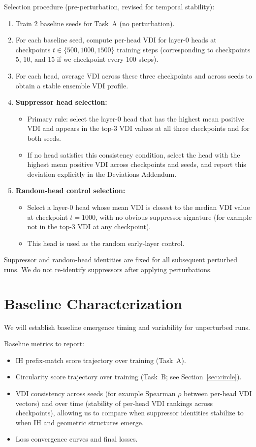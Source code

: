 \documentclass[11pt]{article}
\begin{document}
Selection procedure (pre-perturbation, revised for temporal stability):
\begin{enumerate}
  \item Train 2 baseline seeds for Task~A (no perturbation).
  \item For each baseline seed, compute per-head VDI for layer-0 heads at checkpoints $t \in \{500, 1000, 1500\}$ training steps (corresponding to checkpoints 5, 10, and 15 if we checkpoint every 100 steps).
  \item For each head, average VDI across these three checkpoints and across seeds to obtain a stable ensemble VDI profile.
  \item \textbf{Suppressor head selection:}
    \begin{itemize}
      \item Primary rule: select the layer-0 head that has the highest mean positive VDI and appears in the top-3 VDI values at all three checkpoints and for both seeds.
      \item If no head satisfies this consistency condition, select the head with the highest mean positive VDI across checkpoints and seeds, and report this deviation explicitly in the Deviations Addendum.
    \end{itemize}
  \item \textbf{Random-head control selection:}
    \begin{itemize}
      \item Select a layer-0 head whose mean VDI is closest to the median VDI value at checkpoint $t = 1000$, with no obvious suppressor signature (for example not in the top-3 VDI at any checkpoint).
      \item This head is used as the random early-layer control.
    \end{itemize}
\end{enumerate}

Suppressor and random-head identities are fixed for all subsequent perturbed runs. We do not re-identify suppressors after applying perturbations.

\section{Baseline Characterization}

We will establish baseline emergence timing and variability for unperturbed runs.

Baseline metrics to report:
\begin{itemize}
  \item IH prefix-match score trajectory over training (Task~A).
  \item Circularity score trajectory over training (Task~B; see Section~\ref{sec:circle}).
  \item VDI consistency across seeds (for example Spearman $\rho$ between per-head VDI vectors) and over time (stability of per-head VDI rankings across checkpoints), allowing us to compare when suppressor identities stabilize to when IH and geometric structures emerge.
  \item Loss convergence curves and final losses.
\end{itemize}
\end{document}
